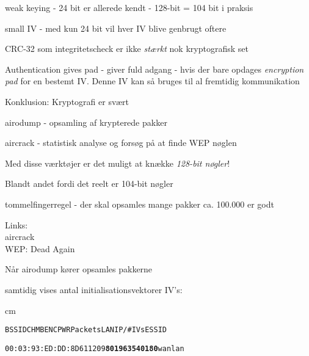 \documentclass[Screen16to9,17pt]{foils}
\begin{document}

\begin{list1}
\item weak keying - 24 bit er allerede kendt - 128-bit = 104 bit i praksis
\item small IV - med kun 24 bit vil hver IV blive genbrugt oftere
\item CRC-32 som integritetscheck er ikke \emph{stærkt} nok
  kryptografisk set
\item Authentication gives pad - giver fuld adgang - hvis der bare
  opdages \emph{encryption pad} for en bestemt IV. Denne IV kan så
  bruges til al fremtidig kommunikation
\end{list1}

{\hlkbig Konklusion: Kryptografi er svært}



\begin{list1}
\item airodump - opsamling af krypterede pakker
\item aircrack - statistisk analyse og forsøg på at finde WEP nøglen
\item Med disse værktøjer er det muligt at knække \emph{128-bit nøgler}!
\item Blandt andet fordi det reelt er 104-bit nøgler \smiley
\item tommelfingerregel - der skal opsamles mange pakker ca. 100.000
  er godt
\item Links:\\
 aircrack\\
 WEP: Dead Again
\end{list1}


\begin{list1}
\item Når airodump kører opsamles pakkerne
\item samtidig vises antal initialisationsvektorer IV's:
\end{list1}

 cm

\begin{alltt}
\hlktiny
   BSSID              CH  MB  ENC  PWR  Packets   LAN IP / # IVs   ESSID

   00:03:93:ED:DD:8D   6  11       209   {\bf 801963                  540180}   wanlan
\end{alltt}
\end{document}
